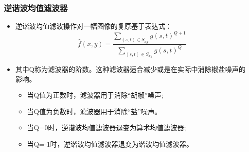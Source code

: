 \documentclass{beamer}
\begin{document}
\begin{frame}
\frametitle{逆谐波均值滤波器}
\label{sec-5-5}

\begin{itemize}
\item 逆谐波均值滤波操作对一幅图像的复原基于表达式：
     \[ \hat f(x,y) = \frac{\sum_{(s,t)\in S_{xy}}g(s,t)^{Q+1}}{\sum_{(s,t)\in S_{xy}}g(s,t)^Q} \]
\item 其中Q称为滤波器的阶数。这种滤波器适合减少或是在实际中消除椒盐噪声的影响。
\begin{itemize}
\item 当Q值为正数时，滤波器用于消除“胡椒”噪声;
\item 当Q值为负数时，滤波器用于消除“盐”噪声。
\item 当Q=0时，逆谐波均值滤波器退变为算术均值滤波器;
\item 当Q=-1时，逆谐波均值滤波器退变为谐波均值滤波器。
\end{itemize}
\end{itemize}
\end{frame}
\end{document}
